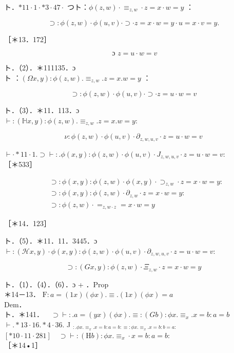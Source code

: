 \documentclass[10pt]{article}
\begin{document}
ト．$* 11 \cdot 1 \cdot * 3 \cdot 47 \cdot$ つト：$\phi(z, w) \cdot \equiv_{z, w} \cdot z=x \cdot w=y$ ：

$$
\supset: \phi(z, w) \cdot \phi(u, v) \cdot \supset \cdot z=x \cdot w=y \cdot u=x \cdot v=y .
$$

［＊13．172］


\begin{equation*}
\text { ɔ } z=u \cdot w=v \tag{2}
\end{equation*}


ト．（2）．＊111135．ɔ\\
ト ：$(\Omega x, y): \phi(z, w) . \equiv_{z, w} . z=x . w=y$ ：


\begin{equation*}
\supset: \phi(z, w) \cdot \phi(u, v) \cdot \supset \cdot z=u \cdot w=v \tag{3}
\end{equation*}


ト．（3）．＊11．113．ɔ\\
$\vdash:(\mathbb{H} x, y): \phi(z, w) . \equiv_{z, w} . z=x . w=y:$


\begin{equation*}
\nu: \phi(z, w) \cdot \phi(u, v) \cdot \partial_{z, w, u, v} \cdot z=u \cdot w=v \tag{4}
\end{equation*}


$\vdash \cdot * 11 \cdot 1 . \supset \vdash: . \phi(x, y): \phi(z, w) \cdot \phi(u, v) \cdot J_{z, w, u, v} \cdot z=u \cdot w=v:$\\
［＊533］


\begin{align*}
& \supset: \phi(x, y): \phi(z, w) \cdot \phi(x, y) \cdot \supset_{z, w} \cdot z=x \cdot w=y: \\
& \supset: \phi(x, y): \phi(z, w) \cdot \partial_{z, w} \cdot z=x \cdot w=y: \\
& \supset: \phi(z, w) \cdot=_{z, w \cdot z}=x \cdot w=y \tag{5}
\end{align*}


［＊14．123］

ト．（5）．＊11．11．3445．ɔ\\
$\vdash:(\mathcal{H} x, y) \cdot \phi(x, y): \phi(z, w) \cdot \phi(u, v) \cdot \partial_{z, w, u, v} \cdot z=u \cdot w=v:$


\begin{equation*}
\supset:(G x, y): \phi(z, w) \cdot \Xi_{z, w} \cdot z=x \cdot w=y \tag{6}
\end{equation*}


ト．（1）．（4）．（6）．ɔ + ．Prop\\
＊14－13． $\mathrm{F}: a=(1 x)(\phi x) . \equiv .(1 x)(\phi x)=a$\\
Dem．\\
ト．＊141．$\quad \supset \vdash: . a=(y x)(\phi x) . \equiv:(G b): \phi x . \equiv_{x} . x=b: a=b$\\
$\vdash . * 13 \cdot 16 . * 4 \cdot 36$. J ${ }_{: . \phi x . \equiv_{x} . x=b: a=b: \equiv: \phi x . \equiv_{x} . x=b: b=a:}$\\
$[* 10 \cdot 11 \cdot 281] \quad \supset \vdash:(\mathrm{H} b): \phi x . \equiv_{x} \cdot x=b: a=b:$\\
［＊14•1］
\end{document}

